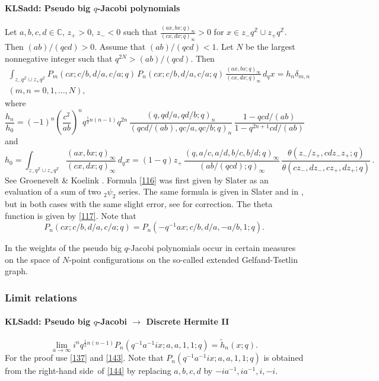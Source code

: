\documentclass[envcountchap,graybox]{svmono}
\newcounter{rom}
\newcommand\CC{\mathbb{C}}
\newcommand\ZZ{\mathbb{Z}}
\newcommand\de\delta
\newcommand\tha\theta
\newcommand\half{\frac12}
\newcommand\iy\infty
\newcommand\wt{\widetilde}
\newcommand\RHS{right-hand side}
\begin{document}
\paragraph{\large\bf KLSadd: Pseudo big $q$-Jacobi polynomials}Let $a,b,c,d\in\CC$, $z_+>0$, $z_-<0$ such that
$\tfrac{(ax,bx;q)_\iy}{(cx,dx;q)_\iy}>0$ for $x\in z_- q^\ZZ\cup z_+ q^\ZZ$.
Then $(ab)/(qcd)>0$. Assume that $(ab)/(qcd)<1$.
Let $N$ be the largest nonnegative integer such that $q^{2N}>(ab)/(qcd)$.
Then
\begin{multline}
\int_{z_- q^\ZZ\cup z_+ q^\ZZ}P_m(cx;c/b,d/a,c/a;q)\,P_n(cx;c/b,d/a,c/a;q)\,
\frac{(ax,bx;q)_\iy}{(cx,dx;q)_\iy}\,d_qx=h_n\de_{m,n}\\
(m,n=0,1,\ldots,N),
\label{114}
\end{multline}
where
\begin{equation}
\frac{h_n}{h_0}=(-1)^n\left(\frac{c^2}{ab}\right)^n q^{\half n(n-1)} q^{2n}\,
\frac{(q,qd/a,qd/b;q)_n}{(qcd/(ab),qc/a,qc/b;q)_n}\,
\frac{1-qcd/(ab)}{1-q^{2n+1}cd/(ab)}
\label{115}
\end{equation}
and
\begin{equation}
h_0=\int_{z_- q^\ZZ\cup z_+ q^\ZZ}\frac{(ax,bx;q)_\iy}{(cx,dx;q)_\iy}\,d_qx
=(1-q)z_+\,
\frac{(q,a/c,a/d,b/c,b/d;q)_\iy}{(ab/(qcd);q)_\iy}\,
\frac{\tha(z_-/z_+,cdz_-z_+;q)}{\tha(cz_-,dz_-,cz_+,dz_+;q)}\,.
\label{116}
\end{equation}
See Groenevelt \& Koelink \cite[Prop.~2.2]{K14}.
Formula \eqref{116} was first given by Slater \cite[(5)]{K15} as an evaluation
of a sum of two ${}_2\psi_2$ series.
The same formula is given in Slater  and in
, but in both cases with the same slight error,
see \cite[2nd paragraph after Lemma 2.1]{K14} for correction.
The theta function is given by \eqref{117}.
Note that
\begin{equation}
P_n(cx;c/b,d/a,c/a;q)=P_n(-q^{-1}ax;c/b,d/a,-a/b,1;q).
\label{145}
\end{equation}

In \cite{K29} the weights of the pseudo big $q$-Jacobi polynomials
occur in certain measures on the space of $N$-point configurations
on the so-called extended Gelfand-Tsetlin graph.
%
\subsubsection*{Limit relations}
\paragraph{\large\bf KLSadd: Pseudo big $q$-Jacobi $\longrightarrow$ Discrete Hermite II}\begin{equation}
\lim_{a\to\iy}i^n q^{\half n(n-1)} P_n(q^{-1}a^{-1}ix;a,a,1,1;q)=
\wt h_n(x;q).
\label{144}
\end{equation}
For the proof use \eqref{137} and \eqref{143}.
Note that $P_n(q^{-1}a^{-1}ix;a,a,1,1;q)$ is obtained from the
\RHS\ of \eqref{144} by replacing $a,b,c,d$ by $-ia^{-1},ia^{-1},i,-i$.
%
\end{document}
